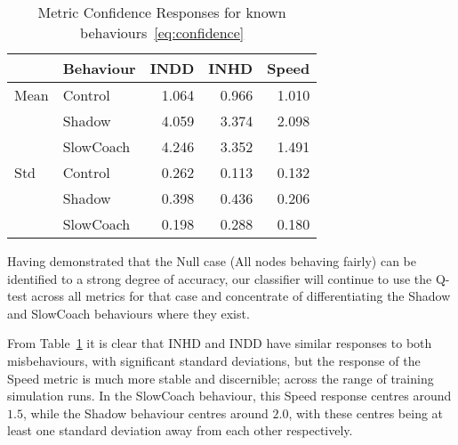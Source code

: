 \begin{table}[h]
  \caption{Metric Confidence Responses for known behaviours~\eqref{eq:confidence}}
  \centering
\begin{tabular}{llrrr}
\toprule
{} & Behaviour &  INDD &  INHD &  Speed \\
\midrule
Mean & Control & 1.064 & 0.966 &  1.010 \\
     & Shadow & 4.059 & 3.374 &  2.098 \\
     & SlowCoach & 4.246 & 3.352 &  1.491 \\
Std & Control & 0.262 & 0.113 &  0.132 \\
     & Shadow & 0.398 & 0.436 &  0.206 \\
     & SlowCoach & 0.198 & 0.288 &  0.180 \\
\bottomrule
\end{tabular}
  \label{tab:confidence}
\end{table}

Having demonstrated that the Null case (All nodes behaving fairly) can be identified to a strong degree of accuracy, our classifier will continue to use the Q-test across all metrics for that case and concentrate of differentiating the Shadow and SlowCoach behaviours where they exist.

From Table~\ref{tab:confidence} it is clear that INHD and INDD have similar responses to both misbehaviours, with significant standard deviations, but the response of the Speed metric is much more stable and discernible; across the range of training simulation runs.
In the SlowCoach behaviour, this Speed response centres around $1.5$, while the Shadow behaviour centres around $2.0$, with these centres being at least one standard deviation away from each other respectively.

